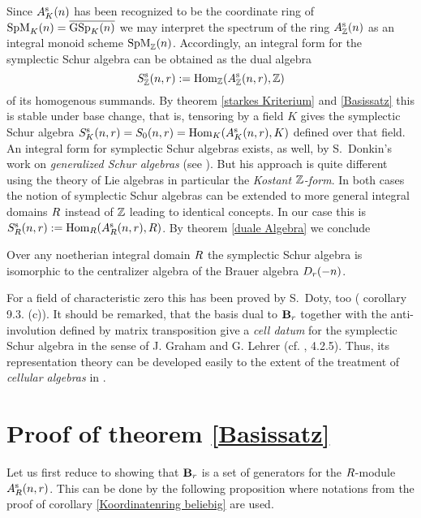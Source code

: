 \documentclass[twoside,12pt]{article}
\begin{document}
Since $\sAn K$ has been recognized to be the
coordinate ring of $\gspm nK=\zgsp nK$ we may interpret the spectrum of
the ring $\sAn{\Z}$ as an integral monoid scheme $\gspm n{\Z}$. Accordingly, an integral
form for the symplectic Schur algebra can be obtained as the
dual algebra  
\[ S_{\Z}^{\rm s}(n,r):=\Hom{\Z}{\rsAn{\Z} r}{\Z}\]
of its homogenous summands. 
By theorem \ref{starkes Kriterium} and
\ref{Basissatz}
this is stable under base change, that is, tensoring by a field $K$
gives the symplectic Schur algebra $S_{K}^{\rm s}(n,r)=S_0(n,r)=\Hom K{\rsAn Kr} K$
defined over that field. An
integral form for symplectic Schur algebras exists, as well, by
S.\ Donkin's work on {\em generalized Schur algebras} (see \cite{donk3}).
But his approach is quite different using the theory of Lie algebras in
particular the {\em Kostant $\Z$-form}.
In both cases the notion of symplectic Schur algebras can be extended
to more general integral domains $\gr$ instead of $\Z$ leading to
identical concepts. In our case this is 
$S^{\rm s}_{\gr}(n,r):=\Hom{\gr}{\rsAn{\gr} r}{\gr}$.
By theorem \ref{duale Algebra} we conclude

\begin{cor}
Over any noetherian integral domain $\gr$
the symplectic Schur algebra is
isomorphic to the centralizer algebra
of the Brauer algebra $\br{r}{-n}$.
\end{cor}

For a field of characteristic zero this has been proved by S.\ Doty,
too (\cite{doty} corollary 9.3. (c)). It should be remarked, that the
basis dual to $\B_r$ together with the anti-involution defined by matrix
transposition give a {\em cell datum} for the symplectic Schur algebra
in the sense of J. Graham and G. Lehrer (cf. \cite{doc}, 4.2.5).
Thus, its representation theory can be developed easily to the extent 
of the treatment of {\em cellular algebras} in \cite{graham}.










\section{Proof of theorem \ref{Basissatz}}



Let us first reduce to showing that $\B_r$ is a set of generators for
the $\gr$-module $\rsAn{\gr} r$. This can be done by the following
proposition where notations from the proof of corollary
\ref{Koordinatenring beliebig} are used.
\end{document}
